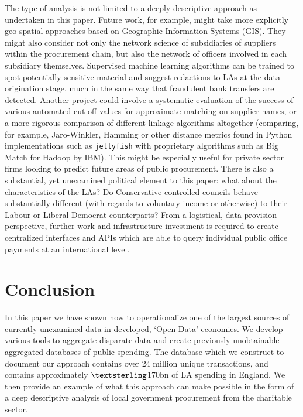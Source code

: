 \documentclass[12pt]{article}
\begin{document}
The type of analysis is not limited to a deeply descriptive approach as undertaken in this paper. Future work, for example, might take more explicitly geo-spatial approaches based on Geographic Information Systems (GIS). They might also consider not only the network science of subsidiaries of suppliers within the procurement chain, but also the network of officers involved in each subsidiary themselves. Supervised machine learning algorithms can be trained to spot potentially sensitive material and suggest redactions to LAs at the data origination stage, much in the same way that fraudulent bank transfers are detected. Another project could involve a systematic evaluation of the success of various automated cut-off values for approximate matching on supplier names, or a more rigorous comparison of different linkage algorithms altogether (comparing, for example, Jaro-Winkler, Hamming or other distance metrics found in Python implementations such as \texttt{jellyfish} with proprietary algorithms such as Big Match for Hadoop by IBM). This might be especially useful for private sector firms looking to predict future areas of public procurement. There is also a substantial, yet unexamined political element to this paper: what about the characteristics of the LAs? Do Conservative controlled councils behave substantially different (with regards to voluntary income or otherwise) to their Labour or Liberal Democrat counterparts? From a logistical, data provision perspective, further work and infrastructure investment is required to create centralized interfaces and APIs which are able to query individual public office payments at an international level.

\section{Conclusion}\label{conclusion}

In this paper we have shown how to operationalize one of the largest sources of currently unexamined data in developed, `Open Data’ economies. We develop various tools to aggregate disparate data and create previously unobtainable aggregated databases of public spending. The database which we construct to document our approach contains over 24 million unique transactions, and contains approximately $\textsterling$170bn of LA spending in England. We then provide an example of what this approach can make possible in the form of a deep descriptive analysis of local government procurement from the charitable sector. 
\end{document}
